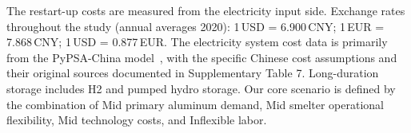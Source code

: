 \documentclass[preprint]{elsarticle}
\begin{document}
\begin{table}[H]
  \raggedright
  \footnotesize
  The restart-up costs are measured from the electricity input side. Exchange rates throughout the study (annual averages 2020): 1\,USD = 6.900\,CNY; 1\,EUR = 7.868\,CNY; 1\,USD = 0.877\,EUR. The electricity system cost data is primarily from the PyPSA-China model~\citep{zhou_multienergy_2024}, with the specific Chinese cost assumptions and their original sources documented in Supplementary Table 7. Long-duration storage includes H2 and pumped hydro storage. Our core scenario is defined by the combination of Mid primary aluminum demand, Mid smelter operational flexibility, Mid technology costs, and Inflexible labor. 
  \normalsize
\end{table}
\end{document}
